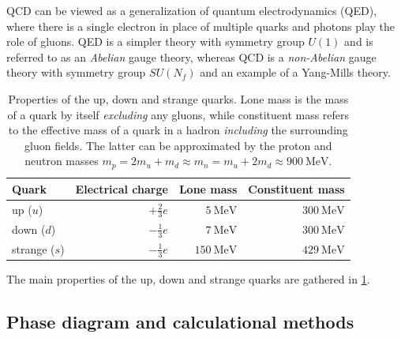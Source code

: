QCD can be viewed as a generalization of quantum electrodynamics (QED),
where there is a single electron in place of multiple quarks and photons play the role of gluons.
QED is a simpler theory with symmetry group $U(1)$ and is referred to as an \emph{Abelian} gauge theory,
whereas QCD is a \emph{non-Abelian} gauge theory with symmetry group $SU(N_f)$ and an example of a Yang-Mills theory.

\begin{table}[b]
\centering
{ \renewcommand{\arraystretch}{1.2} %
\begin{tabular}{ l r r r }
	\toprule
	Quark & Electrical charge & Lone mass & Constituent mass \\
	\midrule
	up ($u$) & $+\frac23 e$ & $\SI{5}{\mega\electronvolt}$ & $\SI{300}{\mega\electronvolt}$ \\
	down ($d$) & $-\frac13 e$ & $\SI{7}{\mega\electronvolt}$ & $\SI{300}{\mega\electronvolt}$ \\
	strange ($s$) & $-\frac13 e$ & $\SI{150}{\mega\electronvolt}$ & $\SI{429}{\mega\electronvolt}$ \\
	\bottomrule
\end{tabular} }
\caption{\label{tab:qcd:quark_properties}%
	Properties of the up, down and strange quarks.
	Lone mass is the mass of a quark by itself \emph{excluding} any gluons,
	while constituent mass refers to the effective mass of a quark in a hadron \emph{including} the surrounding gluon fields.
	The latter can be approximated by the proton and neutron masses $m_p = 2 m_u + m_d \approx m_n = m_u + 2 m_d \approx \SI{900}{\mega\electronvolt}$.
}
\end{table}

The main properties of the up, down and strange quarks are gathered in \cref{tab:qcd:quark_properties}.

\subsection{Phase diagram and calculational methods}
\label{sec:qcd:phase_diagram_and_methods}

